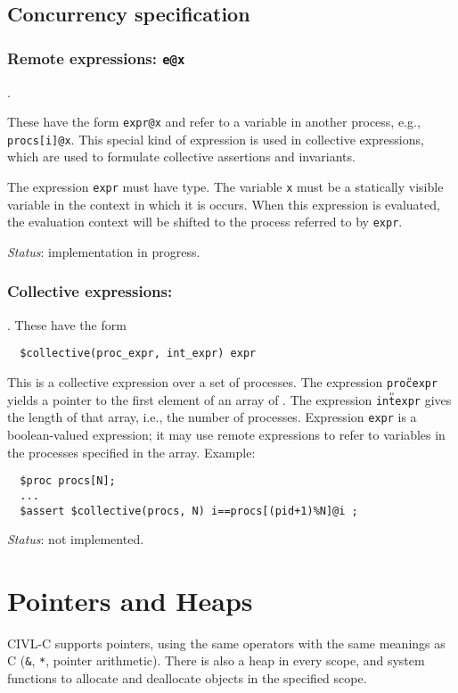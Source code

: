 \section{Concurrency specification}

\subsection{Remote expressions: \texttt{e@x}}.

These have the form \verb!expr@x! and refer to a variable in another
process, e.g., \verb!procs[i]@x!. This special kind of expression is
used in collective expressions, which are used to formulate collective
assertions and invariants.

The expression \verb!expr! must have \cproc{} type.  The variable
\texttt{x} must be a statically visible variable in the context in
which it is occurs.  When this expression is evaluated, the evaluation
context will be shifted to the process referred to by \texttt{expr}.

\emph{Status}: implementation in progress.

\subsection{Collective expressions: \ccollective}.  These have the form
\begin{verbatim}
  $collective(proc_expr, int_expr) expr 
\end{verbatim}
This is a collective expression over a set of processes.  The
expression \texttt{proc{\U}expr} yields a pointer to the first element
of an array of \cproc.  The expression \texttt{int{\U}expr} gives the
length of that array, i.e., the number of processes.  Expression
\texttt{expr} is a boolean-valued expression; it may use remote
expressions to refer to variables in the processes specified in the
array.  Example:
\begin{verbatim}
  $proc procs[N];
  ...
  $assert $collective(procs, N) i==procs[(pid+1)%N]@i ;
\end{verbatim}

\emph{Status}: not implemented.

\chapter{Pointers and Heaps}
\label{chap:pointers}

CIVL-C supports pointers, using the same operators with the same
meanings as C (\texttt{\&}, \texttt{*}, pointer arithmetic).  There is
also a heap in every scope, and system functions to allocate and
deallocate objects in the specified scope.

